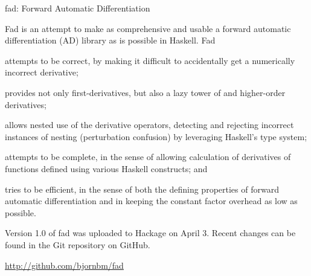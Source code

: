 \documentclass{article}
\begin{document}
\begin{hcarentry}{fad: Forward Automatic Differentiation}
\makeheader


Fad is an attempt to make as comprehensive and usable a forward
automatic differentiation (AD) library as is possible in Haskell.  Fad
\begin{inparaenum}[(a)]
\item attempts to be correct, by making it difficult to accidentally
  get a numerically incorrect derivative;
\item provides not only first-derivatives, but also a lazy tower of
  and higher-order derivatives;
\item allows nested use of the derivative operators, detecting and
  rejecting incorrect instances of nesting (perturbation confusion) by
  leveraging Haskell's type system;
\item attempts to be complete, in the sense of allowing calculation of
  derivatives of functions defined using various Haskell constructs;
  and
\item tries to be efficient, in the sense of both the defining
  properties of forward automatic differentiation and in keeping the
  constant factor overhead as low as possible.
\end{inparaenum}


Version 1.0 of fad was uploaded to Hackage on April 3. Recent changes
can be found in the Git repository on GitHub.



\FurtherReading
  \url{http://github.com/bjornbm/fad}
\end{hcarentry}
\end{document}
